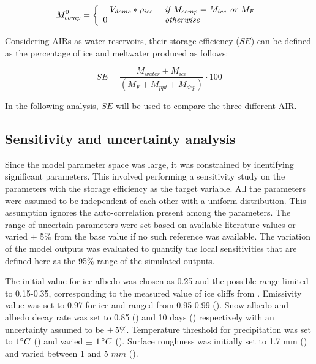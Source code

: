 \documentclass[utf8]{frontiersSCNS} %
\begin{document}
\begin{equation} M_{comp}^0 = \left\{ \begin{array}{ll} -V_{dome} * \rho_{ice} & \textit{ if } M_{comp}=
             M_{ice}\textit{ or }
             M_{F}                                                 \\ 0 & \textit{ otherwise }\\\end{array} \right. \\
\end{equation}

Considering AIRs as water reservoirs, their storage efficiency ($SE$) can be defined as the percentage of ice and
meltwater produced as follows:

\begin{equation} \textit{SE} = \frac{M_{water}+M_{ice}}{(M_F+M_{ppt}+M_{dep})} \cdot 100 \end{equation}

In the following analysis, $SE$ will be used to compare the three different AIR.

\subsection{Sensitivity and uncertainty analysis}
Since the model parameter space was large, it was constrained by identifying significant parameters. This involved
performing a sensitivity study on the parameters with the storage efficiency as the target variable.  All the parameters
were assumed to be independent of each other with a uniform distribution. This assumption ignores the auto-correlation
present among the parameters. The range of uncertain parameters were set based on available literature values or varied
$\pm$ 5\% from the base value if no such reference was available. The variation of the model outputs was evaluated to
quantify the local sensitivities that are defined here as the 95\% range of the simulated outputs.

The initial value for ice albedo was chosen as 0.25 and the possible range limited to 0.15-0.35, corresponding to the
measured value of ice cliffs from \cite{steiner_2015}. Emissivity value was set to 0.97 for ice and ranged from
0.95-0.99 (\cite{steiner_2015}). Snow albedo and albedo decay rate was set to 0.85 (\cite{CuffeyPaterson_2010}) and 10
days (\cite{Schmidt_2017}) respectively with an uncertainty assumed to be $\pm \,5 \%$. Temperature threshold for
precipitation was set to $1 \degree C$ (\cite{FujitaAgeta_2000}) and varied $\pm$ $1\,\degree C$ (\cite{Zhou_2010}).
Surface roughness was initially set to 1.7 mm (\cite{CuffeyPaterson_2010}) and varied between 1 and 5 $mm$
(\cite{BrockWillisSharp_2006}).
\end{document}
